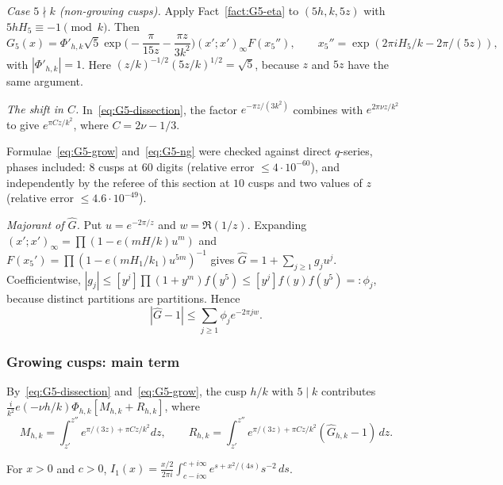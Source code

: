 \emph{Case $5\nmid k$ (non-growing cusps).} Apply Fact~\ref{fact:G5-eta} to $(5h,k,5z)$ with $5hH_5\equiv-1\pmod k$. Then
\begin{equation}\label{eq:G5-ng}
G_5(x)=\Phi'_{h,k}\sqrt5\exp\Big(-\frac\pi{15z}-\frac{\pi z}{3k^2}\Big)(x';x')_\infty F(x_5''),\qquad
x_5''=\exp(2\pi iH_5/k-2\pi/(5z)),
\end{equation}
with $|\Phi'_{h,k}|=1$. Here $(z/k)^{-1/2}(5z/k)^{1/2}=\sqrt5$, because $z$ and $5z$ have the same argument.

\emph{The shift in $C$.} In~\eqref{eq:G5-dissection}, the factor $e^{-\pi z/(3k^2)}$ combines with $e^{2\pi\nu z/k^2}$ to
give $e^{\pi Cz/k^2}$, where $C=2\nu-1/3$.

Formulae~\eqref{eq:G5-grow} and~\eqref{eq:G5-ng} were checked against direct $q$-series, phases included: $8$ cusps at $60$
digits (relative error $\le4\cdot10^{-60}$), and independently by the referee of this section at $10$ cusps and two values
of $z$ (relative error $\le4.6\cdot10^{-49}$).

\emph{Majorant of $\hat G$.} Put $u=e^{-2\pi/z}$ and $w=\Re(1/z)$. Expanding $(x';x')_\infty=\prod(1-e(mH/k)u^m)$ and
$F(x_5')=\prod(1-e(mH_1/k_1)u^{5m})^{-1}$ gives $\hat G=1+\sum_{j\ge1}g_ju^j$. Coefficientwise,
$|g_j|\le[y^j]\prod(1+y^m)f(y^5)\le[y^j]f(y)f(y^5)=:\phi_j$, because distinct partitions are partitions. Hence
\begin{equation}\label{eq:G5-maj}
|\hat G-1|\le\sum_{j\ge1}\phi_je^{-2\pi jw}.
\end{equation}

\subsubsection{Growing cusps: main term}
By~\eqref{eq:G5-dissection} and~\eqref{eq:G5-grow}, the cusp $h/k$ with $5\mid k$ contributes
$\frac i{k^2}e(-\nu h/k)\Phi_{h,k}[M_{h,k}+R_{h,k}]$, where
\[
M_{h,k}=\int_{z'}^{z''}e^{\pi/(3z)+\pi Cz/k^2}dz,\qquad R_{h,k}=\int_{z'}^{z''}e^{\pi/(3z)+\pi Cz/k^2}(\hat G_{h,k}-1)\,dz.
\]

\begin{fact}\label{fact:G5-bessel}
For $x>0$ and $c>0$, $I_1(x)=\frac{x/2}{2\pi i}\int_{c-i\infty}^{c+i\infty}e^{s+x^2/(4s)}s^{-2}\,ds$.
\end{fact}

